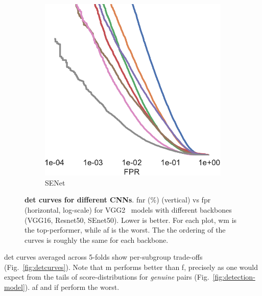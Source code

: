 \documentclass[10pt,twocolumn,letterpaper]{article}
\begin{document}
\begin{figure}[h!]
\begin{subfigure}[t]{.27\linewidth}
    \includegraphics[width=.8\linewidth]{figures/curve_senet50_subgroups-crop.pdf}
    \caption{SENet~\cite{hu2018squeeze}}
    \end{subfigure}
    \caption{\textbf{\gls{det} curves for different CNNs}. \gls{fnr} (\%) (vertical) vs \gls{fpr}  (horizontal, log-scale) for VGG2~\cite{Cao18} models with different backbones (VGG16, Resnet50, SEnet50). Lower is better. For each plot, \gls{wm} is the top-performer, while \gls{af} is the worst. The the ordering of the curves is roughly the same for each backbone.}\label{fig:sdm-appendix-a}
\end{figure}




\gls{det} curves averaged across 5-folds show per-subgroup trade-offs (Fig.~\ref{fig:detcurves}). Note that \gls{m} performs better than \gls{f}, precisely as one would expect from the tails of score-distributions for \emph{genuine} pairs (Fig.~\ref{fig:detection-model}). \Gls{af} and \gls{if} perform the worst.
\end{document}
